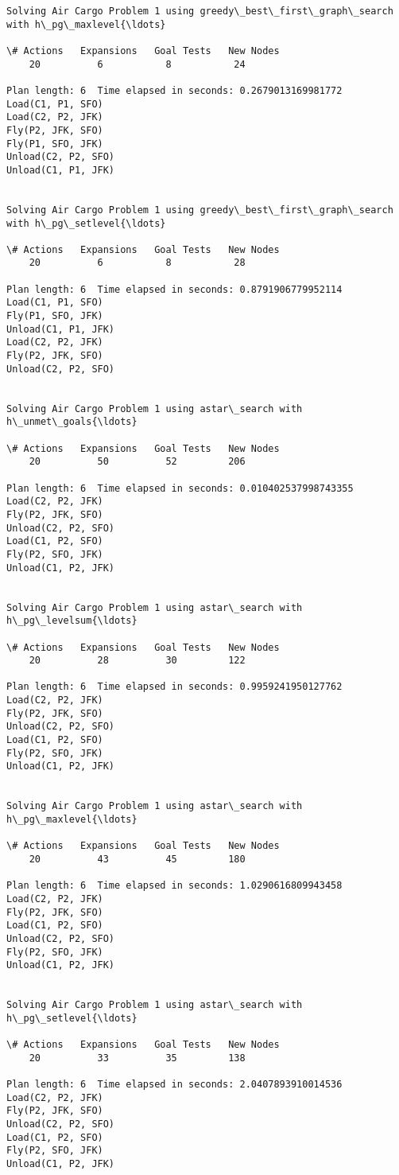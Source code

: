 \documentclass[11pt]{article}
\begin{document}
\begin{Verbatim}[commandchars=\\\{\}]
Solving Air Cargo Problem 1 using greedy\_best\_first\_graph\_search with h\_pg\_maxlevel{\ldots}

\# Actions   Expansions   Goal Tests   New Nodes
    20          6           8           24    

Plan length: 6  Time elapsed in seconds: 0.2679013169981772
Load(C1, P1, SFO)
Load(C2, P2, JFK)
Fly(P2, JFK, SFO)
Fly(P1, SFO, JFK)
Unload(C2, P2, SFO)
Unload(C1, P1, JFK)


Solving Air Cargo Problem 1 using greedy\_best\_first\_graph\_search with h\_pg\_setlevel{\ldots}

\# Actions   Expansions   Goal Tests   New Nodes
    20          6           8           28    

Plan length: 6  Time elapsed in seconds: 0.8791906779952114
Load(C1, P1, SFO)
Fly(P1, SFO, JFK)
Unload(C1, P1, JFK)
Load(C2, P2, JFK)
Fly(P2, JFK, SFO)
Unload(C2, P2, SFO)


Solving Air Cargo Problem 1 using astar\_search with h\_unmet\_goals{\ldots}

\# Actions   Expansions   Goal Tests   New Nodes
    20          50          52         206    

Plan length: 6  Time elapsed in seconds: 0.010402537998743355
Load(C2, P2, JFK)
Fly(P2, JFK, SFO)
Unload(C2, P2, SFO)
Load(C1, P2, SFO)
Fly(P2, SFO, JFK)
Unload(C1, P2, JFK)


Solving Air Cargo Problem 1 using astar\_search with h\_pg\_levelsum{\ldots}

\# Actions   Expansions   Goal Tests   New Nodes
    20          28          30         122    

Plan length: 6  Time elapsed in seconds: 0.9959241950127762
Load(C2, P2, JFK)
Fly(P2, JFK, SFO)
Unload(C2, P2, SFO)
Load(C1, P2, SFO)
Fly(P2, SFO, JFK)
Unload(C1, P2, JFK)


Solving Air Cargo Problem 1 using astar\_search with h\_pg\_maxlevel{\ldots}

\# Actions   Expansions   Goal Tests   New Nodes
    20          43          45         180    

Plan length: 6  Time elapsed in seconds: 1.0290616809943458
Load(C2, P2, JFK)
Fly(P2, JFK, SFO)
Load(C1, P2, SFO)
Unload(C2, P2, SFO)
Fly(P2, SFO, JFK)
Unload(C1, P2, JFK)


Solving Air Cargo Problem 1 using astar\_search with h\_pg\_setlevel{\ldots}

\# Actions   Expansions   Goal Tests   New Nodes
    20          33          35         138    

Plan length: 6  Time elapsed in seconds: 2.0407893910014536
Load(C2, P2, JFK)
Fly(P2, JFK, SFO)
Unload(C2, P2, SFO)
Load(C1, P2, SFO)
Fly(P2, SFO, JFK)
Unload(C1, P2, JFK)


    \end{Verbatim}
\end{document}
